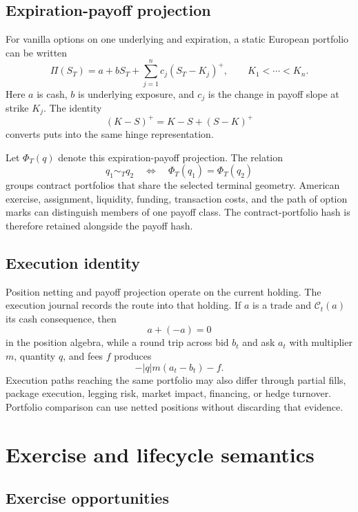 \documentclass{strategynet-journal}
\begin{document}
\begin{SNcolumns}

\subsection{Expiration-payoff projection}

For vanilla options on one underlying and expiration, a static European
portfolio can be written
\[
  \Pi(S_T)
  =a+bS_T+\sum_{j=1}^{n}c_j(S_T-K_j)^+,
  \qquad K_1<\cdots<K_n.
\]
Here \(a\) is cash, \(b\) is underlying exposure, and \(c_j\) is the change in
payoff slope at strike \(K_j\).  The identity
\[
  (K-S)^+=K-S+(S-K)^+
\]
converts puts into the same hinge representation.

Let \(\Phi_T(q)\) denote this expiration-payoff projection.  The relation
\[
  q_1\sim_T q_2
  \quad\Longleftrightarrow\quad
  \Phi_T(q_1)=\Phi_T(q_2)
\]
groups contract portfolios that share the selected terminal geometry.
American exercise, assignment, liquidity, funding, transaction costs, and the
path of option marks can distinguish members of one payoff class.  The
contract-portfolio hash is therefore retained alongside the payoff hash.

\subsection{Execution identity}

Position netting and payoff projection operate on the current holding.  The
execution journal records the route into that holding.  If \(a\) is a trade
and \(\mathcal C_t(a)\) its cash consequence, then
\[
  a+(-a)=0
\]
in the position algebra, while a round trip across bid \(b_t\) and ask \(a_t\)
with multiplier \(m\), quantity \(q\), and fees \(f\) produces
\[
  -|q|m(a_t-b_t)-f.
\]
Execution paths reaching the same portfolio may also differ through partial
fills, package execution, legging risk, market impact, financing, or hedge
turnover.  Portfolio comparison can use netted positions without discarding
that evidence.

\section{Exercise and lifecycle semantics}
\label{sec:lifecycle}

\subsection{Exercise opportunities}


\end{SNcolumns}
\end{document}
